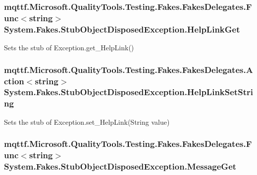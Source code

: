 \hypertarget{class_system_1_1_fakes_1_1_stub_object_disposed_exception_a56a12a7542b71fba55d67c080780bf42}{
\subsubsection[{Help\-Link\-Get}]{\setlength{\rightskip}{0pt plus 5cm}mqttf.\-Microsoft.\-Quality\-Tools.\-Testing.\-Fakes.\-Fakes\-Delegates.\-Func$<$string$>$ System.\-Fakes.\-Stub\-Object\-Disposed\-Exception.\-Help\-Link\-Get}}\label{class_system_1_1_fakes_1_1_stub_object_disposed_exception_a56a12a7542b71fba55d67c080780bf42}


Sets the stub of Exception.\-get\-\_\-\-Help\-Link()

\hypertarget{class_system_1_1_fakes_1_1_stub_object_disposed_exception_a870ee6aa19f1fd732bc2e9db2c9fb9ee}{
\subsubsection[{Help\-Link\-Set\-String}]{\setlength{\rightskip}{0pt plus 5cm}mqttf.\-Microsoft.\-Quality\-Tools.\-Testing.\-Fakes.\-Fakes\-Delegates.\-Action$<$string$>$ System.\-Fakes.\-Stub\-Object\-Disposed\-Exception.\-Help\-Link\-Set\-String}}\label{class_system_1_1_fakes_1_1_stub_object_disposed_exception_a870ee6aa19f1fd732bc2e9db2c9fb9ee}


Sets the stub of Exception.\-set\-\_\-\-Help\-Link(\-String value)

\hypertarget{class_system_1_1_fakes_1_1_stub_object_disposed_exception_afa01e5ff1d90740446310bbeef0f8dd4}{
\subsubsection[{Message\-Get}]{\setlength{\rightskip}{0pt plus 5cm}mqttf.\-Microsoft.\-Quality\-Tools.\-Testing.\-Fakes.\-Fakes\-Delegates.\-Func$<$string$>$ System.\-Fakes.\-Stub\-Object\-Disposed\-Exception.\-Message\-Get}}\label{class_system_1_1_fakes_1_1_stub_object_disposed_exception_afa01e5ff1d90740446310bbeef0f8dd4}


